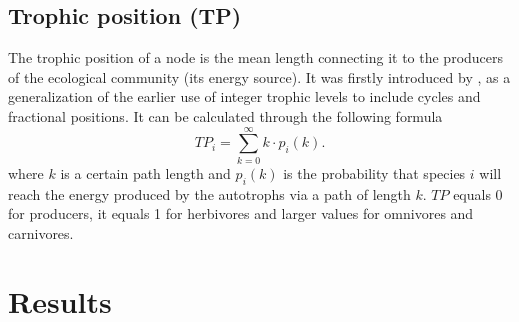 \documentclass[twocolumn]{article}
\begin{document}
	\subsection*{Trophic position (TP)}
		The trophic position of a node is the mean length connecting it to the producers of the ecological community (its energy source). It was firstly introduced by \citet{Levine1980}, as a generalization of the earlier use of integer trophic levels to include cycles and fractional positions. It can be calculated through the following formula
		\begin{equation}
			TP_i=\sum\limits_{k=0}^\infty k \cdot p_i(k).
		\end{equation}
		where $k$ is a certain path length and $p_i(k)$ is the probability that species $i$ will reach the energy produced by the autotrophs via a path of length $k$. $TP$ equals 0 for producers, it equals 1 for herbivores and larger values for omnivores and carnivores.
\section*{Results}
\end{document}
